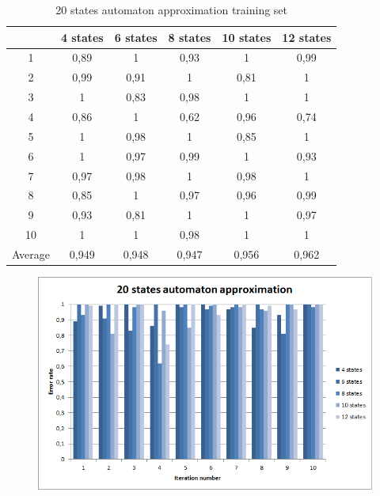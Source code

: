 \documentclass[runningheads,a4paper]{llncs}
\begin{document}
\begin{table}[]
\centering
\caption{20 states automaton approximation training set}
\label{my-label}
\begin{tabular}{@{}cccccc@{}}
\toprule
        & 4 states & 6 states & 8 states & 10 states & 12 states    \\ \midrule
1       & 0,89     & 1        & 0,93     & 1         & 0,99 \\
2       & 0,99     & 0,91     & 1        & 0,81      & 1 \\
3       & 1        & 0,83     & 0,98     & 1         & 1 \\
4       & 0,86     & 1        & 0,62     & 0,96      & 0,74   \\
5       & 1        & 0,98     & 1        & 0,85      & 1   \\
6       & 1        & 0,97     & 0,99     & 1         & 0,93    \\
7       & 0,97     & 0,98     & 1        & 0,98      & 1    \\
8       & 0,85     & 1        & 0,97     & 0,96      & 0,99     \\
9       & 0,93     & 0,81     & 1        & 1         & 0,97 \\
10      & 1        & 1        & 0,98     & 1         & 1  \\
Average & 0,949    & 0,948    & 0,947    & 0,956     & 0,962  \\ \bottomrule
\end{tabular}
\end{table}

\begin{figure}
\centering
\includegraphics[scale=1]{7.png}
\end{figure}
\end{document}
